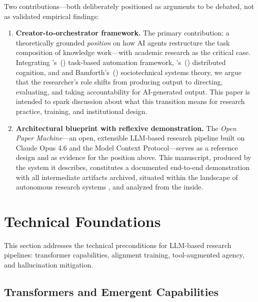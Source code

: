 \documentclass{article}
\begin{document}
Two contributions---both deliberately positioned as arguments to be debated, not as validated empirical findings:

\begin{enumerate}
  \item \textbf{Creator-to-orchestrator framework.} The primary contribution: a theoretically grounded \textit{position} on how AI agents restructure the task composition of knowledge work---with academic research as the critical case. Integrating \citeauthor{autor2015why}'s~(\citeyear{autor2015why}) task-based automation framework, \citeauthor{hutchins1995cognition}'s~(\citeyear{hutchins1995cognition}) distributed cognition, and \citeauthor{trist1951social} and Bamforth's~(\citeyear{trist1951social}) sociotechnical systems theory, we argue that the researcher's role shifts from producing output to directing, evaluating, and taking accountability for AI-generated output. This paper is intended to spark discussion about what this transition means for research practice, training, and institutional design.
  \item \textbf{Architectural blueprint with reflexive demonstration.} The \textit{Open Paper Machine}---an open, extensible LLM-based research pipeline built on Claude Opus 4.6 and the Model Context Protocol---serves as a reference design and as evidence for the position above. This manuscript, produced by the system it describes, constitutes a documented end-to-end demonstration with all intermediate artifacts archived, situated within the landscape of autonomous research systems \citep{handler2023taxonomy,wang2024survey}, and analyzed from the inside.
\end{enumerate}


\section{Technical Foundations}
\label{sec:tech}

This section addresses the technical preconditions for LLM-based research pipelines: transformer capabilities, alignment training, tool-augmented agency, and hallucination mitigation.

\subsection{Transformers and Emergent Capabilities}
\end{document}

